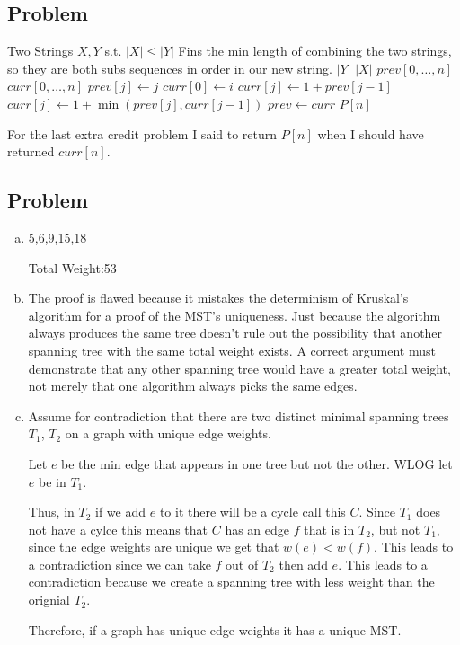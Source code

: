 \documentclass[12pt, letterpaper]{article}
\theoremstyle{definition}
\newcounter{problem}
\newcommand{\q}{
    \newpage %
    \stepcounter{problem} %
    \subsection*{Problem \arabic{problem}} %
}
\begin{document}
\pagestyle{fancy}
\fancyhf{}
\fancyhead[ROE]{\thepage}

\q
\begin{algorithm}[H]
    \caption{Min Cost}
    \begin{algorithmic}[1]
    \Require Two Strings $X,Y$ s.t. $|X| \leq |Y|$
    \Ensure Fins the min length of combining the two strings, so they are both subs sequences in order in our new string.
            \State \Return $|Y|$
        \EndIf
            \State \Return $|X|$
        \EndIf
        \State $prev[0,\dots,n]$
        \State $curr[0,\dots,n]$
            \State $prev[j] \gets j$
        \EndFor
            \State $curr[0] \gets i$
                    \State $curr[j] \gets 1 + prev[j-1]$
                \Else
                    \State $curr[j] \gets 1 + \min(prev[j], curr[j-1])$
                \EndIf
            \EndFor
            \State $prev \gets curr$
        \EndFor
        \State \Return $P[n]$
    \EndFunction
    \end{algorithmic}
    \end{algorithm}
For the last extra credit problem I said to return $P[n]$ when I should have returned $curr[n]$.

\q
\begin{enumerate}[(a)]
    \item 5,6,9,15,18
    
    Total Weight:53

    \item The proof is flawed because it mistakes the determinism of Kruskal's algorithm for a proof of the MST's uniqueness. Just because the algorithm always produces the same tree doesn't rule out the possibility that another spanning tree with the same total weight exists. A correct argument must demonstrate that any other spanning tree would have a greater total weight, not merely that one algorithm always picks the same edges.
    
    \item Assume for contradiction that there are two distinct minimal spanning trees $T_1$, $T_2$ on a graph with unique edge weights.
    
    Let $e$ be the min edge that appears in one tree but not the other. WLOG let $e$ be in $T_1$.

    Thus, in $T_2$ if we add $e$ to it there will be a cycle call this $C$. Since $T_1$ does not have a cylce this means that $C$ has an edge $f$ that is in $T_2$, but not $T_1$, since the edge weights are unique we get that $w(e) < w(f)$. This leads to a contradiction since we can take $f$ out of $T_2$ then add $e$. This leads to a contradiction because we create a spanning tree with less weight than the orignial $T_2$.

    Therefore, if a graph has unique edge weights it has a unique MST.
\end{enumerate}
\end{document}

